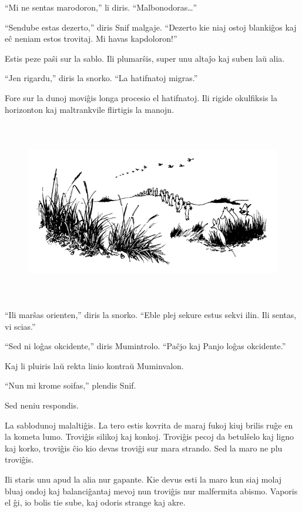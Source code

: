 ``Mi ne sentas marodoron,'' li diris. ``Malbonodoras{\ldots}''

``Sendube estas dezerto,'' diris Snif malgaje. ``Dezerto kie niaj ostoj blankiĝos kaj eĉ neniam estos trovitaj. Mi havas kapdoloron!''

Estis peze paŝi sur la sablo. Ili plumarŝis, super unu altaĵo kaj suben laŭ alia.

``Jen rigardu,'' diris la snorko. ``La hatifnatoj migras.''

Fore sur la dunoj moviĝis longa procesio el hatifnatoj. Ili rigide okulfiksis la horizonton kaj maltrankvile flirtigis la manojn.

\begin{figure}[htbp]
\centering
\includegraphics[width=449pt,height=223pt]{7-1.png}
\caption{}
\label{7-1}
\end{figure}

``Ili marŝas orienten,'' diris la snorko. ``Eble plej sekure estus sekvi ilin. Ili sentas, vi scias.''

``Sed ni loĝas okcidente,'' diris Mumintrolo. ``Paĉjo kaj Panjo loĝas okcidente.''

Kaj li pluiris laŭ rekta linio kontraŭ Muminvalon.

``Nun mi krome soifas,'' plendis Snif.

Sed neniu respondis.

La sablodunoj malaltiĝis. La tero estis kovrita de maraj fukoj kiuj brilis ruĝe en la kometa lumo. Troviĝis silikoj kaj konkoj. Troviĝis pecoj da betulŝelo kaj ligno kaj korko, troviĝis ĉio kio devas troviĝi sur mara strando. Sed la maro ne plu troviĝis.

Ili staris unu apud la alia nur gapante. Kie devus esti la maro kun siaj molaj bluaj ondoj kaj balanciĝantaj mevoj nun troviĝis nur malfermita abismo. Vaporis el ĝi, io bolis tie sube, kaj odoris strange kaj akre.

